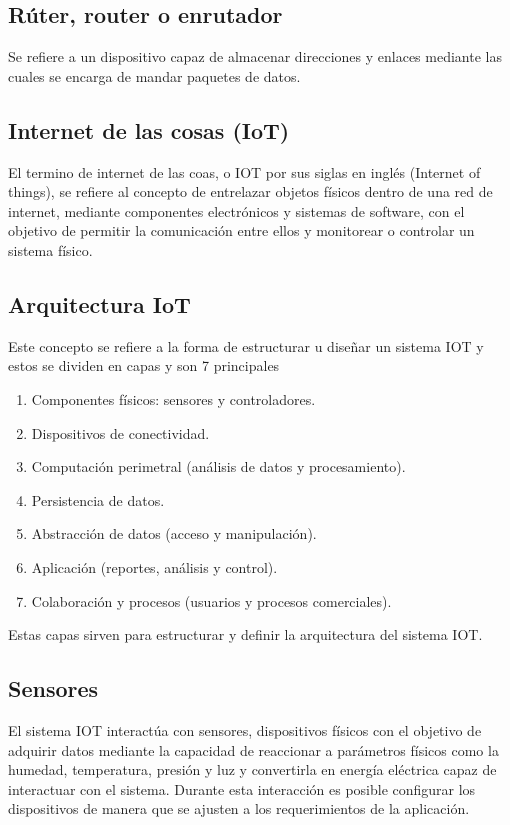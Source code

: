 \subsection{Rúter, router o enrutador}
Se refiere a un dispositivo capaz de almacenar direcciones y enlaces mediante las cuales se encarga de mandar paquetes de datos.\cite{kamal_2017}

\subsection{Internet de las cosas (IoT)}
El termino de internet de las coas, o IOT por sus siglas en inglés (Internet of things), se refiere al concepto de entrelazar objetos físicos dentro de una red de internet, mediante componentes electrónicos y sistemas de software, con el objetivo de permitir la comunicación entre ellos y monitorear o controlar un sistema físico. \cite{kamal_2017}

\subsection{Arquitectura IoT}
Este concepto se refiere a la forma de estructurar u diseñar un sistema IOT y estos se dividen en capas y son 7 principales
\begin{enumerate}
    \renewcommand\labelenumi{\arabic{enumi}.}
    \item Componentes físicos: sensores y controladores.
    \item Dispositivos de conectividad.
    \item Computación perimetral (análisis de datos y procesamiento).
    \item Persistencia de datos.
    \item Abstracción de datos (acceso y manipulación).
    \item Aplicación (reportes, análisis y control).
    \item Colaboración y procesos (usuarios y procesos comerciales).
\end{enumerate}
Estas capas sirven para estructurar y definir la arquitectura del sistema IOT.\cite{kamal_2017}


\subsection{Sensores}
El sistema IOT interactúa con sensores, dispositivos físicos con el objetivo de adquirir datos mediante la capacidad de reaccionar a parámetros físicos como la humedad, temperatura, presión y luz y convertirla en energía eléctrica capaz de interactuar con el sistema. Durante esta interacción es posible configurar los dispositivos de manera que se ajusten a los requerimientos de la aplicación.\cite{kamal_2017}

